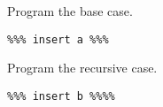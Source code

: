 
\begin{Parts}

\Part Program the base case.

\begin{solution}
\begin{lstlisting}
%%% insert a %%%
\end{lstlisting}
\end{solution}

\Part Program the recursive case.

\begin{solution}
\begin{lstlisting}
%%% insert b %%%%
\end{lstlisting}
\end{solution}

\end{Parts}
